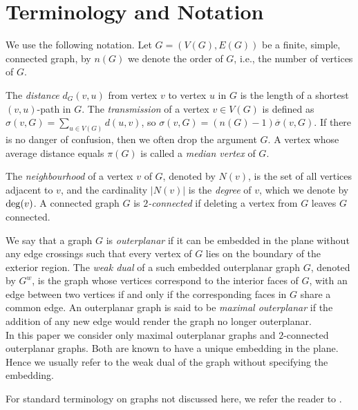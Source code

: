 \documentclass[a4paper,11pt]{article}
\numberwithin{equation}{theorem}
\begin{document}
\section{Terminology and Notation}
\label{section:terminolory}

We use the following notation. 
Let $G=(V(G),E(G))$ be a finite, simple, connected graph, by $n(G)$ we 
denote the order of $G$, i.e., the number of vertices of $G$. 

The \emph{distance} $d_G(v,u)$ from vertex  $v$ to vertex $u$ in $G$ is the length of a shortest 
$(v,u)$-path in $G$. 
The \emph{transmission} of a vertex  $v\in V(G)$ is defined as 
$\sigma(v, G)=\sum_{u\in V(G)}d(u,v)$, so $\sigma(v,G) = (n(G)-1) \overline{\sigma}(v,G)$. 
If there is no danger of confusion, then we often drop the argument $G$. 
A vertex whose average distance equals $\pi(G)$ is called a \emph{median vertex} of $G$. 

The \emph{neighbourhood} of a vertex $v$ of $G$, denoted by $N(v)$, is the set of all vertices adjacent to $v$, and the cardinality $|N(v)|$ is the \emph{degree} of $v$, which we
denote by ${\rm deg}(v)$. 
A connected graph $G$ is \emph{$2$-connected} if deleting a vertex from $G$ leaves $G$ connected.

We say that a graph $G$ is \emph{outerplanar} if it can be embedded in the plane without any edge crossings such that every vertex of $G$ lies on the boundary of the exterior region.
The \emph{weak dual} of a such embedded outerplanar graph $G$, denoted by $G^{w}$, is the graph whose vertices correspond to the interior faces of $G$, with an edge between two vertices if and only if the corresponding faces in $G$ share a common edge. An outerplanar graph is said to be \emph{maximal outerplanar} if the addition of any new edge would render the graph no longer outerplanar. \\
In this paper we consider only maximal outerplanar graphs and $2$-connected outerplanar graphs.
Both are known to have a unique embedding in the plane. Hence we usually refer to the weak dual of 
the graph without specifying the embedding.  

For standard terminology on graphs not discussed here, we refer the reader to \cite{ChaLesZha2016}.
\end{document}
